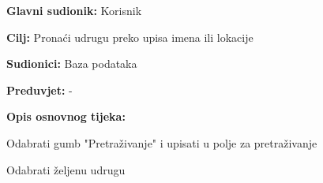 				\noindent {}
					\begin{packed_item}
						
						\item \textbf{Glavni sudionik: } Korisnik
						\item  \textbf{Cilj:} Pronaći udrugu preko upisa imena ili lokacije
						\item  \textbf{Sudionici:} Baza podataka
						\item  \textbf{Preduvjet:} -
						\item  \textbf{Opis osnovnog tijeka:} 
						
						\item[] \begin{packed_enum}
							
							\item Odabrati gumb "Pretraživanje" i upisati u polje za pretraživanje
							\item Odabrati željenu udrugu
							\end{packed_enum}
						
					\end{packed_item}
				
